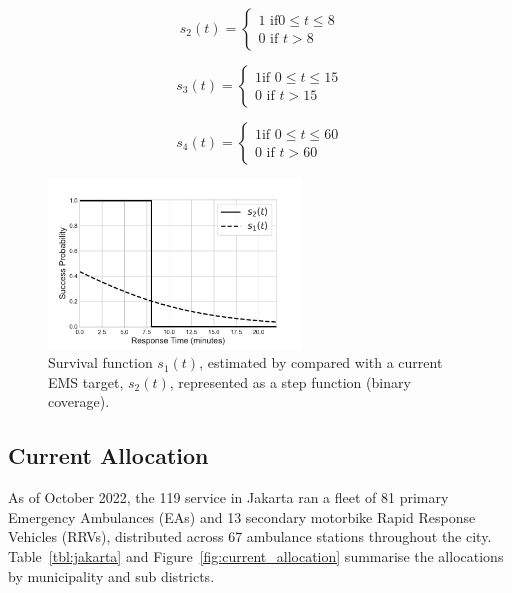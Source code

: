\documentclass[preprint,12pt]{elsarticle}
\begin{document}
\begin{equation}\label{eqn:survival_cutoff_8} s_2(t) = \begin{cases} 1 \text{ if
} 0\leq t \leq 8 \\ 0 \text{ if } t > 8 \end{cases} \end{equation}

\begin{equation}\label{eqn:survival_cutoff_15} s_3(t) = \begin{cases} 1 \text{
if } 0\leq t \leq 15 \\ 0 \text{ if } t > 15 \end{cases} \end{equation}

\begin{equation}\label{eqn:survival_cutoff_60} s_4(t) = \begin{cases} 1 \text{
if } 0\leq t \leq 60 \\ 0 \text{ if } t > 60 \end{cases} \end{equation}

\begin{figure}[ht] \centering
    \includegraphics[width=0.6\textwidth]{img/Survival_Function_(new).pdf}
    \caption{Survival function $s_1(t)$, estimated by \cite{Valenzuela20001206}
    compared with a current EMS target, $s_2(t)$, represented as a step function
    (binary coverage).} \label{fig:survivalfunction} \end{figure}


\subsection{Current Allocation}\label{sec:analysis_current} As of October 2022,
the 119 service in Jakarta ran a fleet of 81 primary Emergency Ambulances (EAs)
and 13 secondary motorbike Rapid Response Vehicles (RRVs), distributed across 67
ambulance stations throughout the city. Table~\ref{tbl:jakarta} and
Figure~\ref{fig:current_allocation} summarise the allocations by municipality
and sub districts. 
\end{document}
